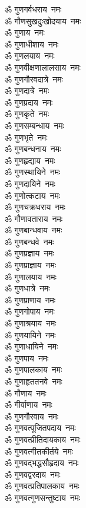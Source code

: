 \begin{multicols}{2}
\begin{flushleft}
ॐ गुणगर्वधराय~नमः\\
ॐ गौणसुखदुःखोदयाय~नमः\\
ॐ गुणाय~नमः\hfill{}\\
ॐ गुणाधीशाय~नमः\\
ॐ गुणलयाय~नमः\\
ॐ गुणवीक्षणालालसाय~नमः\\
ॐ गुणगौरवदात्रे~नमः\\
ॐ गुणदात्रे~नमः\\
ॐ गुणप्रदाय~नमः\\
ॐ गुणकृते~नमः\\
ॐ गुणसम्बन्धाय~नमः\\
ॐ गुणभृते~नमः\\
ॐ गुणबन्धनाय~नमः\hfill{}\\
ॐ गुणहृद्याय~नमः\\
ॐ गुणस्थायिने~नमः\\
ॐ गुणदायिने~नमः\\
ॐ गुणोत्कटाय~नमः\\
ॐ गुणचक्रधराय~नमः\\
ॐ गौणावताराय~नमः\\
ॐ गुणबान्धवाय~नमः\\
ॐ गुणबन्धवे~नमः\\
ॐ गुणप्रज्ञाय~नमः\\
ॐ गुणप्राज्ञाय~नमः\hfill{}\\
ॐ गुणालयाय~नमः\\
ॐ गुणधात्रे~नमः\\
ॐ गुणप्राणाय~नमः\\
ॐ गुणगोपाय~नमः\\
ॐ गुणाश्रयाय~नमः\\
ॐ गुणयायिने~नमः\\
ॐ गुणाधायिने~नमः\\
ॐ गुणपाय~नमः\\
ॐ गुणपालकाय~नमः\\
ॐ गुणाहृततनवे~नमः\hfill{}\\
ॐ गौणाय~नमः\\
ॐ गीर्वाणाय~नमः\\
ॐ गुणगौरवाय~नमः\\
ॐ गुणवत्पूजितपदाय~नमः\\
ॐ गुणवत्प्रीतिदायकाय~नमः\\
ॐ गुणवत्गीतकीर्तये~नमः\\
ॐ गुणवद्भद्धसौहृदाय~नमः\\
ॐ गुणवद्वरदाय~नमः\\
ॐ गुणवत्प्रतिपालकाय~नमः\\
ॐ गुणवत्गुणसन्तुष्टाय~नमः\hfill{}\\

\end{flushleft}
\end{multicols}
